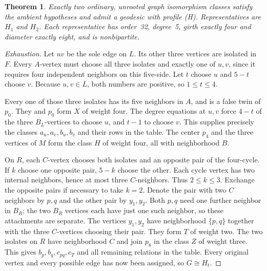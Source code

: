 \documentclass[11pt]{article}
\newtheorem{theorem}{Theorem}
\begin{document}
\begin{theorem}\label{classification}
Exactly two ordinary, unrooted graph isomorphism classes satisfy the
ambient hypotheses and admit a geodesic with profile \textup{(H)}.
Representatives are $H_1$ and $H_2$.
Each representative has order~32, degree~5, girth exactly four and
diameter exactly eight, and is nonbipartite.
\end{theorem}
\begin{proof}[Exhaustion]
Let $uv$ be the sole edge on $L$. Its other three vertices are isolated
in $F$. Every $A$-vertex must choose all three isolates and exactly one
of $u,v$, since it requires four independent neighbors on this five-side.
Let $t$ choose $u$ and $5-t$ choose $v$. Because $u,v\in L$, both
numbers are positive, so $1\leq t\leq4$.

Every one of those three isolates has its five neighbors in $A$,
and is a false twin of $p_0$. They and $p_0$ form $X$ of weight four.
The degree equations at $u,v$ force $4-t$ of the three $B_L$-vertices
to choose $u$, and $t-1$ to choose $v$. This supplies precisely the
classes $a_u,a_v,b_u,b_v$ and their rows in the table.
The center $p_4$ and the three vertices of $M$ form the class $H$ of
weight four, all with neighborhood $B$.

On $R$, each $C$-vertex chooses both isolates and an opposite pair
of the four-cycle. If $k$ choose one opposite pair, $5-k$ choose
the other. Each cycle vertex has two internal neighbors, hence at
most three $C$-neighbors. Thus $2\leq k\leq3$. Exchange the opposite
pairs if necessary to take $k=2$. Denote the pair with two $C$
neighbors by $p,q$ and the other pair by $y_1,y_2$.
Both $p,q$ need one further neighbor in $B_R$; the two $B_R$ vertices
each have just one such neighbor, so these attachments are separate.
The vertices $y_1,y_2$ have neighborhood $\{p,q\}$ together with
the three $C$-vertices choosing their pair. They form $T$ of weight two.
The two isolates on $R$ have neighborhood $C$ and join $p_8$ in the
class $Z$ of weight three. This gives $b_p,b_q,c_{pq},c_T$ and all
remaining relations in the table. Every original vertex and every
possible edge has now been assigned, so $G\cong H_t$.
\end{proof}
\end{document}

